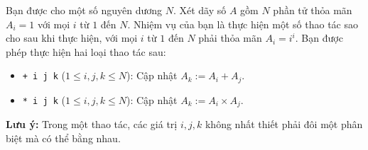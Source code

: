 Bạn được cho một số nguyên dương $N$. Xét dãy số $A$ gồm $N$ phần tử thỏa mãn $A_i=1$ với mọi $i$ từ $1$ đến $N$. Nhiệm vụ của bạn là thực hiện một số thao tác sao cho sau khi thực hiện, với mọi $i$ từ $1$ đến $N$ phải thỏa mãn $A_i=i^i$. Bạn được phép thực hiện hai loại thao tác sau:

\begin{itemize}
    \item \texttt{+ i j k} ($1\le i,j,k\le N$): Cập nhật $A_k := A_i + A_j$.
    \item \texttt{* i j k} ($1\le i,j,k\le N$): Cập nhật $A_k := A_i \times A_j$.
\end{itemize}

\textbf{Lưu ý:} Trong một thao tác, các giá trị $i,j,k$ không nhất thiết phải đôi một phân biệt mà có thể bằng nhau.